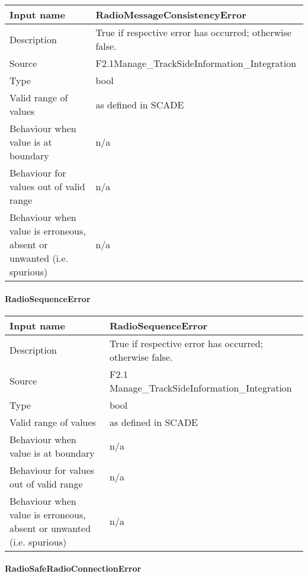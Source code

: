 \begin{longtable}{p{}p{}}
\toprule
Input name				& RadioMessageConsistencyError \\
\midrule
Description				& True if respective error has occurred; otherwise false. \\
\midrule
Source					& F2.1Manage\_TrackSideInformation\_Integration \\ 
\midrule
Type					& bool \\
\midrule
Valid range of values	& as defined in SCADE \\
\midrule
Behaviour when value is at boundary	& n/a \\
\midrule
Behaviour for values out of valid range	& n/a \\
\midrule
Behaviour when value is erroneous, absent or unwanted (i.e. spurious) & n/a \\
\bottomrule
\end{longtable}

\paragraph{RadioSequenceError}

\begin{longtable}{p{}p{}}
\toprule
Input name				& RadioSequenceError \\
\midrule
Description				& True if respective error has occurred; otherwise false. \\
\midrule
Source					& F2.1 Manage\_TrackSideInformation\_Integration \\ 
\midrule
Type					& bool \\
\midrule
Valid range of values	& as defined in SCADE \\
\midrule
Behaviour when value is at boundary	& n/a \\
\midrule
Behaviour for values out of valid range	& n/a \\
\midrule
Behaviour when value is erroneous, absent or unwanted (i.e. spurious) & n/a \\
\bottomrule
\end{longtable}

\paragraph{RadioSafeRadioConnectionError}

